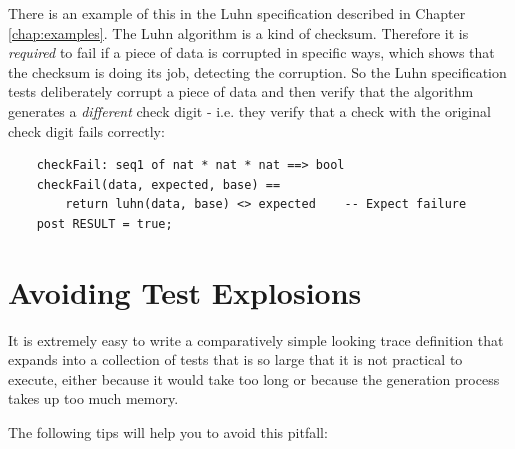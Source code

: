 \documentclass{overturerepchap}
\begin{document}
There is an example of this in the Luhn specification described in Chapter
\ref{chap:examples}. The Luhn algorithm is a kind of checksum. Therefore it is
\emph{required} to fail if a piece of data is corrupted in specific ways, which
shows that the checksum is doing its job, detecting the corruption. So the Luhn
specification tests deliberately corrupt a piece of data and then verify that
the algorithm generates a \emph{different} check digit - i.e. they verify that a
check with the original check digit fails correctly:

\scriptsize
\begin{lstlisting}
    checkFail: seq1 of nat * nat * nat ==> bool
    checkFail(data, expected, base) ==
        return luhn(data, base) <> expected    -- Expect failure
    post RESULT = true;
\end{lstlisting}
\normalsize

\section{Avoiding Test Explosions}

It is extremely easy to write a comparatively simple looking trace definition
that expands into a collection of tests that is so large that it is not
practical to execute, either because it would take too long or because the
generation process takes up too much memory.

The following tips will help you to avoid this pitfall:
\end{document}
